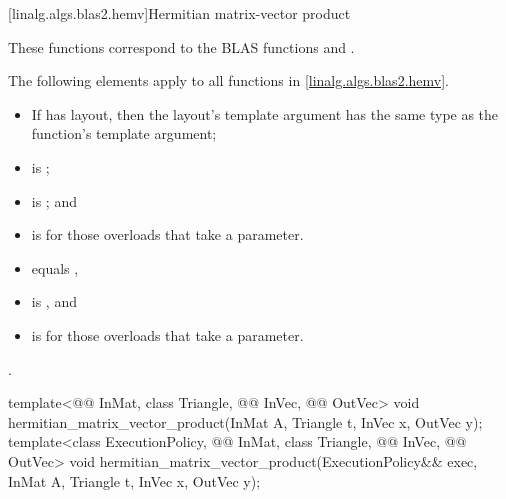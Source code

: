 [linalg.algs.blas2.hemv]{Hermitian matrix-vector product}

\pnum
\begin{note}
These functions correspond to the BLAS functions
 and .
\end{note}

\pnum
The following elements apply to all functions in \ref{linalg.algs.blas2.hemv}.

\pnum
\mandates
\begin{itemize}
\item
If  has  layout,
then the layout's  template argument
has the same type as the function's  template argument;
\item
{}
is ;
\item
{}
is ; and
\item
{}
is  for those overloads that take a  parameter.
\end{itemize}

\pnum
\expects
\begin{itemize}
\item
{} equals ,
\item
{} is , and
\item
{} is  for those overloads that take a  parameter.
\end{itemize}

\pnum
\complexity
{}.

\begin{itemdecl}
template<@@ InMat, class Triangle, @@ InVec, @@ OutVec>
  void hermitian_matrix_vector_product(InMat A, Triangle t, InVec x, OutVec y);
template<class ExecutionPolicy,
         @@ InMat, class Triangle, @@ InVec, @@ OutVec>
  void hermitian_matrix_vector_product(ExecutionPolicy&& exec,
                                       InMat A, Triangle t, InVec x, OutVec y);
\end{itemdecl}

